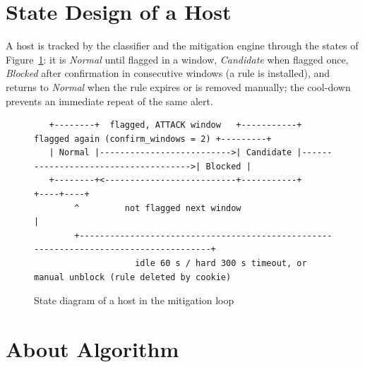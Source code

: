 \section{State Design of a Host}

A host is tracked by the classifier and the mitigation engine through the states of Figure~\ref{fig:state}: it is \emph{Normal} until flagged in a window, \emph{Candidate} when flagged once, \emph{Blocked} after confirmation in consecutive windows (a rule is installed), and returns to \emph{Normal} when the rule expires or is removed manually; the cool-down prevents an immediate repeat of the same alert.

\begin{figure}[htbp]
\centering
\scriptsize
\begin{verbatim}
   +--------+  flagged, ATTACK window   +-----------+  flagged again (confirm_windows = 2) +---------+
   | Normal |-------------------------->| Candidate |------------------------------------->| Blocked |
   +--------+<--------------------------+-----------+                                     +----+----+
        ^         not flagged next window                                                       |
        +-------------------------------------------------------------------------------------+
                    idle 60 s / hard 300 s timeout, or manual unblock (rule deleted by cookie)
\end{verbatim}
\caption{State diagram of a host in the mitigation loop}
\label{fig:state}
\end{figure}

\section{About Algorithm}

